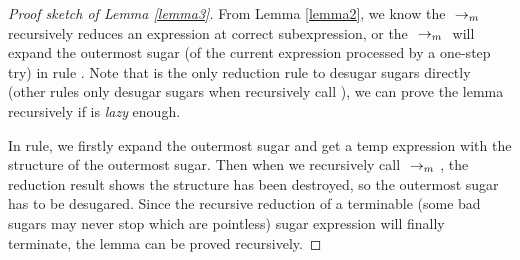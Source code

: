 \begin{proof}[Proof sketch of Lemma \ref{lemma3}]
From Lemma \ref{lemma2}, we know the $~\rightarrow_m~$ recursively reduces an expression at correct subexpression, or the $~\rightarrow_m~$ will expand the outermost sugar (of the current expression processed by a one-step try) in rule . Note that  is the only reduction rule to desugar sugars directly (other rules only desugar sugars when recursively call ), we can prove the lemma recursively if  is \emph{lazy} enough.

In  rule, we firstly expand the outermost sugar and get a temp expression with the structure of the outermost sugar. Then when we recursively call $~\rightarrow_m~$, the reduction result shows the structure has been destroyed, so the outermost sugar has to be desugared. Since the recursive reduction of a terminable (some bad sugars may never stop which are pointless) sugar expression will finally terminate, the lemma can be proved recursively.
\end{proof}
